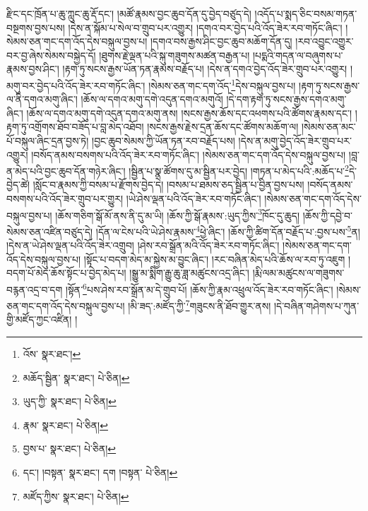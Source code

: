 རྫིང་དང་ཁྲོན་པ་ཆུ་ཀླུང་ཆུ་རྡོ་དང་། །མཚོ་རྣམས་བྱང་ཆུབ་དོན་དུ་བྱེད་བཙུད་དེ། །འདོད་པ་སྨད་ཅིང་བསམ་གཏན་བསྔགས་བྱས་པས། །དེས་ན་སྐོམ་པ་སེལ་བ་གྲུབ་པར་འགྱུར། །དགའ་བར་བྱེད་པའི་འོད་ཟེར་རབ་གཏོང་ཞིང་། །སེམས་ཅན་གང་དག་འོད་དེས་བསྐུལ་བྱས་པ། །དགའ་བས་རྒྱས་ཤིང་བྱང་ཆུབ་མཆོག་དོན་དུ། །རབ་འབྱུང་འགྱུར་བར་བྱ་ཞེས་སེམས་བསྐྱེད་དོ། །ཐུགས་རྗེ་ལྡན་པའི་སྐུ་གཟུགས་མཚན་བརྒྱན་པ། །པདྨའི་གདན་ལ་བཞུགས་པ་རྣམས་བྱས་ཤིང་། །རྟག་ཏུ་སངས་རྒྱས་ཡོན་ཏན་རྣམས་བརྗོད་པ། །དེས་ན་དགའ་བྱེད་འོད་ཟེར་གྲུབ་པར་འགྱུར། །མགུ་བར་བྱེད་པའི་འོད་ཟེར་རབ་གཏོང་ཞིང་། །སེམས་ཅན་གང་དག་འོད་\footnote{འོས་  སྣར་ཐང་། }དེས་བསྐུལ་བྱས་པ། །རྟག་ཏུ་སངས་རྒྱས་ལ་ནི་དགའ་མགུ་ཞིང་། །ཆོས་ལ་དགའ་མགུ་དགེ་འདུན་དགའ་མགུའོ། །དེ་དག་རྟག་ཏུ་སངས་རྒྱས་དགའ་མགུ་ཞིང་། །ཆོས་ལ་དགའ་མགུ་དགེ་འདུན་དགའ་མགུ་ནས། །སངས་རྒྱས་ཆོས་དང་འཕགས་པའི་ཚོགས་རྣམས་དང་། །རྟག་ཏུ་འགྲོགས་ཐོབ་བཟོད་པ་བླ་མེད་འཐོབ། །སངས་རྒྱས་རྗེས་དྲན་ཆོས་དང་ཚོགས་མཆོག་ལ། །སེམས་ཅན་མང་པོ་བསྐུལ་ཞིང་དྲན་བྱས་ཏེ། །བྱང་ཆུབ་སེམས་ཀྱི་ཡོན་ཏན་རབ་བརྗོད་པས། །དེས་ན་མགུ་བྱེད་འོད་ཟེར་གྲུབ་པར་འགྱུར། །བསོད་ནམས་བསགས་པའི་འོད་ཟེར་རབ་གཏོང་ཞིང་། །སེམས་ཅན་གང་དག་འོད་དེས་བསྐུལ་བྱས་པ། །བླ་ན་མེད་པའི་བྱང་ཆུབ་དོན་གཉེར་ཞིང་། །སྦྱིན་པ་སྣ་ཚོགས་དུ་མ་སྦྱིན་པར་བྱེད། །གཏན་པ་མེད་པའི་:མཆོད་པ་\footnote{མཆོད་སྦྱིན་  སྣར་ཐང་།  པེ་ཅིན། }དེ་བྱེད་ཚེ། །སློང་བ་རྣམས་ཀྱི་བསམ་པ་རྫོགས་བྱེད་དེ། །བསམ་པ་ཐམས་ཅད་སྦྱིན་པ་བྱིན་བྱས་པས། །བསོད་ནམས་བསགས་པའི་འོད་ཟེར་གྲུབ་པར་གྱུར། །ཡེ་ཤེས་ལྡན་པའི་འོད་ཟེར་རབ་གཏོང་ཞིང་། །སེམས་ཅན་གང་དག་འོད་དེས་བསྐུལ་བྱས་པ། །ཆོས་གཅིག་སྒོ་མོ་ནས་ནི་དུ་མ་ཡི། །ཆོས་ཀྱི་སྒོ་རྣམས་:ཡུད་ཀྱིས་\footnote{ཡུད་ཀྱི་  སྣར་ཐང་།  པེ་ཅིན། }ཁོང་དུ་ཆུད། །ཆོས་ཀྱི་དབྱེ་བ་སེམས་ཅན་འཛིན་བཙུད་དེ། །དོན་ལ་ངེས་པའི་ཡེ་ཤེས་རྣམས་\footnote{རྣམ་  སྣར་ཐང་།  པེ་ཅིན། }ཕྱེ་ཞིང་། །ཆོས་ཀྱི་ཚིག་དོན་བརྗོད་པ་:བྱས་པས་\footnote{བྱས་པ་  སྣར་ཐང་།  པེ་ཅིན། }ན། །དེས་ན་ཡེ་ཤེས་ལྡན་པའི་འོད་ཟེར་འགྲུབ། །ཤེས་རབ་སྒྲོན་མའི་འོད་ཟེར་རབ་གཏོང་ཞིང་། །སེམས་ཅན་གང་དག་འོད་དེས་བསྐུལ་བྱས་པ། །སྟོང་པ་བདག་མེད་མ་སྐྱེས་མ་བྱུང་ཞིང་། །རང་བཞིན་མེད་པའི་ཆོས་ལ་རབ་ཏུ་འཇུག །བདག་པོ་མེད་ཆོས་སྟོང་པ་བྱེད་མེད་པ། །སྒྱུ་མ་སྨིག་རྒྱུ་ཆུ་ཟླ་མཚུངས་འདྲ་ཞིང་། །རྨི་ལམ་མཚུངས་ལ་གཟུགས་བརྙན་འདྲ་བ་དག །སྟོན་\footnote{དང་། །བསྟན་  སྣར་ཐང་། དག །བསྟན་  པེ་ཅིན། }པས་ཤེས་རབ་སྒྲོན་མ་དེ་གྲུབ་པོ། །ཆོས་ཀྱི་རྣམ་འཕྲུལ་འོད་ཟེར་རབ་གཏོང་ཞིང་། །སེམས་ཅན་གང་དག་འོད་དེས་བསྐུལ་བྱས་པ། །མི་ཟད་:མཛོད་ཀྱི་\footnote{མཛོད་ཀྱིས་  སྣར་ཐང་།  པེ་ཅིན། }གཟུངས་ནི་ཐོབ་གྱུར་ནས། །དེ་བཞིན་གཤེགས་པ་ཀུན་གྱི་མཛོད་ཀྱང་འཛིན། །
